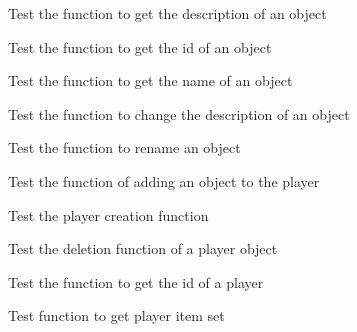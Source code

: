 \begin{DoxyRefList}
\item[\label{test__test000110}%
\Hypertarget{test__test000110}%
Global \hyperlink{object__test_8c_a35d9a40796133791c157c044ea1cef85}{test2\+\_\+object\+\_\+get\+\_\+description} ()]Test the function to get the description of an object  
\item[\label{test__test000112}%
\Hypertarget{test__test000112}%
Global \hyperlink{object__test_8c_a1ff250f0f43297f57fcce1f3a6ae490b}{test2\+\_\+object\+\_\+get\+\_\+id} ()]Test the function to get the id of an object  
\item[\label{test__test000114}%
\Hypertarget{test__test000114}%
Global \hyperlink{object__test_8c_abdfafbc7b8588d3dcdb05fd2beb2397e}{test2\+\_\+object\+\_\+get\+\_\+name} ()]Test the function to get the name of an object  
\item[\label{test__test000108}%
\Hypertarget{test__test000108}%
Global \hyperlink{object__test_8c_a65e32c3642c1d9207cdd84b134c616da}{test2\+\_\+object\+\_\+set\+\_\+description} ()]Test the function to change the description of an object  
\item[\label{test__test000106}%
\Hypertarget{test__test000106}%
Global \hyperlink{object__test_8c_acf42b7e7be91ede243f2aaa56c4c9347}{test2\+\_\+object\+\_\+set\+\_\+name} ()]Test the function to rename an object  
\item[\label{test__test000118}%
\Hypertarget{test__test000118}%
Global \hyperlink{player__test_8c_a864d3935cf61953950b10df0e656306d}{test2\+\_\+player\+\_\+add\+\_\+object} ()]Test the function of adding an object to the player  
\item[\label{test__test000116}%
\Hypertarget{test__test000116}%
Global \hyperlink{player__test_8c_a4f6eca5f9d8c08d2a7fc70c209ecf854}{test2\+\_\+player\+\_\+create} ()]Test the player creation function  
\item[\label{test__test000121}%
\Hypertarget{test__test000121}%
Global \hyperlink{player__test_8c_a4a1855514d6fbd8387f730de40437cf4}{test2\+\_\+player\+\_\+dell\+\_\+object} ()]Test the deletion function of a player object  
\item[\label{test__test000135}%
\Hypertarget{test__test000135}%
Global \hyperlink{player__test_8c_a9fa80f0c0e46b45eb9f1685b102a5826}{test2\+\_\+player\+\_\+get\+\_\+id} ()]Test the function to get the id of a player  
\item[\label{test__test000137}%
\Hypertarget{test__test000137}%
Global \hyperlink{player__test_8c_a8f3a62c708fbed848568841ca8b1cd26}{test2\+\_\+player\+\_\+get\+\_\+inventory} ()]Test function to get player item set  

\end{DoxyRefList}
